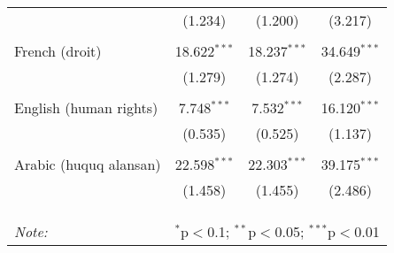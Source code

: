 \begin{table}[!htbp]
\begin{tabular}{@{\extracolsep{5pt}}lccc}
  & (1.234) & (1.200) & (3.217) \\ 
  & & & \\ 
 French (droit) & 18.622$^{***}$ & 18.237$^{***}$ & 34.649$^{***}$ \\ 
  & (1.279) & (1.274) & (2.287) \\ 
  & & & \\ 
 English (human rights) & 7.748$^{***}$ & 7.532$^{***}$ & 16.120$^{***}$ \\ 
  & (0.535) & (0.525) & (1.137) \\ 
  & & & \\ 
 Arabic (huquq alansan) & 22.598$^{***}$ & 22.303$^{***}$ & 39.175$^{***}$ \\ 
  & (1.458) & (1.455) & (2.486) \\ 
  & & & \\ 
\hline \\[-1.8ex] 
\hline 
\hline \\[-1.8ex] 
\textit{Note:}  & \multicolumn{3}{r}{$^{*}$p$<$0.1; $^{**}$p$<$0.05; $^{***}$p$<$0.01} \\ 
\end{tabular} 
\end{table} 

